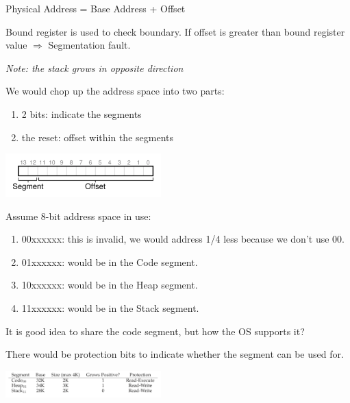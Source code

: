     \begin{center}
        Physical Address = Base Address + Offset
    \end{center}

    Bound register is used to check boundary. If offset is greater than
    bound register value $\Rightarrow$ Segmentation fault.

    \textit{Note: the stack grows in opposite direction}

    We would chop up the address space into two parts:

    \begin{enumerate}
        \item 2 bits: indicate the segments
        \item the reset: offset within the segments
    \end{enumerate}

    \includegraphics[width=0.45\textwidth]{chapters/chapter1/Segmentation_Paging/ReferingSegments.png}

    Assume 8-bit address space in use:
    \begin{enumerate}
        \item 00xxxxxx: this is invalid, we would address 1/4 less because we don't use 00. 
        \item 01xxxxxx: would be in the Code segment.
        \item 10xxxxxx: would be in the Heap segment.
        \item 11xxxxxx: would be in the Stack segment.
    \end{enumerate}


    It is good idea to share the code segment, but how the OS supports it?

    There would be protection bits to indicate whether the segment can be used for.
    
    \includegraphics[width=0.45\textwidth]{chapters/chapter1/Segmentation_Paging/SegementWithProtection.png}


